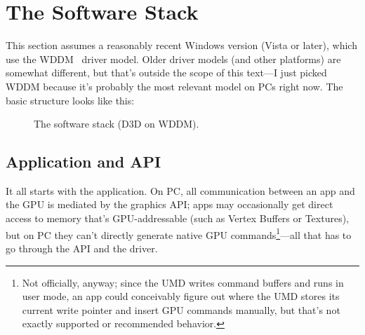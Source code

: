\chapter{The Software Stack}
\label{ch:swstack}


This section assumes a reasonably recent Windows version (Vista or later),
which use the WDDM~\citep{wddm} driver model. Older driver models (and other
platforms) are somewhat different, but that's outside the scope of this
text---I just picked WDDM because it's probably the most relevant model on
PCs right now. The basic structure looks like this:

\begin{figure}[h]
\centering
{}
\label{fig:swstack:swstack}
\caption{The software stack (D3D on WDDM).}
\end{figure}

\section{Application and API}

It all starts with the application. On PC, all communication between an app and
the GPU is mediated by the graphics API; apps may occasionally get direct
access to memory that's GPU-addressable (such as Vertex Buffers or Textures),
but on PC they can't directly generate native GPU commands\footnote{Not
officially, anyway; since the UMD writes command buffers and runs in user mode,
an app could conceivably figure out where the UMD stores its current write
pointer and insert GPU commands manually, but that's not exactly supported or
recommended behavior.}---all that has to go through the API and the driver.

